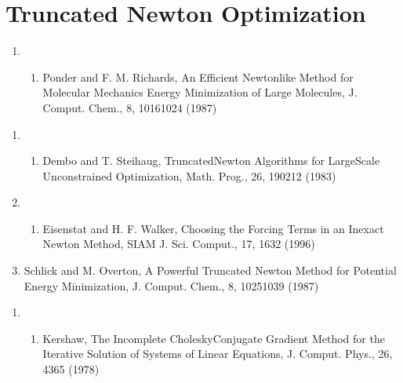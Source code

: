\documentclass[letterpaper,11pt,english]{sphinxmanual}
\begin{document}
\section{Truncated Newton Optimization}
\label{\detokenize{text/references:truncated-newton-optimization}}\begin{enumerate}
%
\setcounter{enumi}{9}
\item {} \begin{enumerate}
%
\setcounter{enumii}{22}
\item {} 
Ponder and F. M. Richards, An Efficient Newton\sphinxhyphen{}like Method for Molecular Mechanics Energy Minimization of Large Molecules, J. Comput. Chem., 8, 1016\sphinxhyphen{}1024 (1987)

\end{enumerate}

\end{enumerate}
\begin{enumerate}
%
\setcounter{enumi}{17}
\item {} \begin{enumerate}
%
\setcounter{enumii}{18}
\item {} 
Dembo and T. Steihaug, Truncated\sphinxhyphen{}Newton Algorithms for Large\sphinxhyphen{}Scale Unconstrained Optimization, Math. Prog., 26, 190\sphinxhyphen{}212 (1983)

\end{enumerate}

\item {} \begin{enumerate}
%
\setcounter{enumii}{2}
\item {} 
Eisenstat and H. F. Walker, Choosing the Forcing Terms in an Inexact Newton Method, SIAM J. Sci. Comput., 17, 16\sphinxhyphen{}32 (1996)

\end{enumerate}

\item {} 
Schlick and M. Overton, A Powerful Truncated Newton Method for Potential Energy Minimization, J. Comput. Chem., 8, 1025\sphinxhyphen{}1039 (1987)

\end{enumerate}
\begin{enumerate}
%
\setcounter{enumi}{3}
\item {} \begin{enumerate}
%
\setcounter{enumii}{18}
\item {} 
Kershaw, The Incomplete Cholesky\sphinxhyphen{}Conjugate Gradient Method for the Iterative Solution of Systems of Linear Equations, J. Comput. Phys., 26, 43\sphinxhyphen{}65 (1978)

\end{enumerate}

\end{enumerate}
\end{document}
